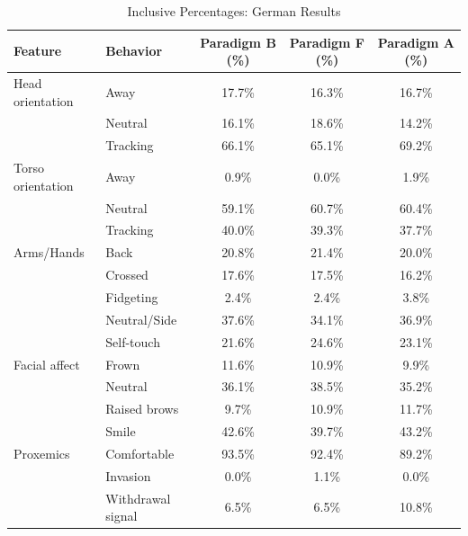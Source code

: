 \begin{table}[ht]
\centering
\caption{Inclusive Percentages: German Results}
\label{tab:inclusive_pct_german}
\begin{tabular}{llccc}
\toprule
Feature & Behavior & Paradigm B (\%) & Paradigm F (\%) & Paradigm A (\%) \\
\midrule
Head orientation & Away & 17.7\% & 16.3\% & 16.7\% \\
~ & Neutral & 16.1\% & 18.6\% & 14.2\% \\
~ & Tracking & 66.1\% & 65.1\% & 69.2\% \\
\midrule
Torso orientation & Away & 0.9\% & 0.0\% & 1.9\% \\
~ & Neutral & 59.1\% & 60.7\% & 60.4\% \\
~ & Tracking & 40.0\% & 39.3\% & 37.7\% \\
\midrule
Arms/Hands & Back & 20.8\% & 21.4\% & 20.0\% \\
~ & Crossed & 17.6\% & 17.5\% & 16.2\% \\
~ & Fidgeting & 2.4\% & 2.4\% & 3.8\% \\
~ & Neutral/Side & 37.6\% & 34.1\% & 36.9\% \\
~ & Self-touch & 21.6\% & 24.6\% & 23.1\% \\
\midrule
Facial affect & Frown & 11.6\% & 10.9\% & 9.9\% \\
~ & Neutral & 36.1\% & 38.5\% & 35.2\% \\
~ & Raised brows & 9.7\% & 10.9\% & 11.7\% \\
~ & Smile & 42.6\% & 39.7\% & 43.2\% \\
\midrule
Proxemics & Comfortable & 93.5\% & 92.4\% & 89.2\% \\
~ & Invasion & 0.0\% & 1.1\% & 0.0\% \\
~ & Withdrawal signal & 6.5\% & 6.5\% & 10.8\% \\
\bottomrule
\end{tabular}
\end{table}